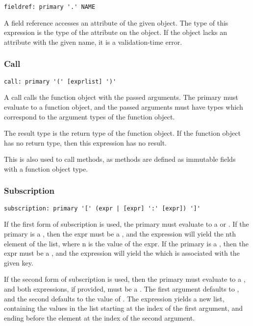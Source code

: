 \begin{lstlisting}
fieldref: primary '.' NAME
\end{lstlisting}

A field reference accesses an attribute of the given object. The type of this
expression is the type of the attribute on the object. If the object lacks
an attribute with the given name, it is a validation-time error.

\subsubsection{Call}
\label{sec:call}
\begin{lstlisting}
call: primary '(' [exprlist] ')'
\end{lstlisting}

A call calls the function object with the passed arguments. The primary must
evaluate to a function object, and the passed arguments must have types which
correspond to the argument types of the function object.

The result type is the return type of the function object. If the function
object has no return type, then this expression has no result.

This is also used to call methods, as methods are defined as immutable fields
with a function object type.

\subsubsection{Subscription}
\label{sec:spec_subscription}
\begin{lstlisting}
subscription: primary '[' (expr | [expr] ':' [expr]) ']'
\end{lstlisting}

If the first form of subscription is used, the primary must evaluate to a
\code{[T]} or . If the primary is a \code{[T]}, then the expr must
be a , and the expression will yield the nth element of the list,
where n is the value of the expr. If the primary is a , then the
expr must be a , and the expression will yield the  which is
associated with the given key.

If the second form of subscription is used, then the primary must evaluate to a
\code{[T]}, and both expressions, if provided, must be a . The first
argument defaults to , and the second defaults to the value of
. The expression yields a new list, containing the values in
the list starting at the index of the first argument, and ending before the
element at the index of the second argument.

